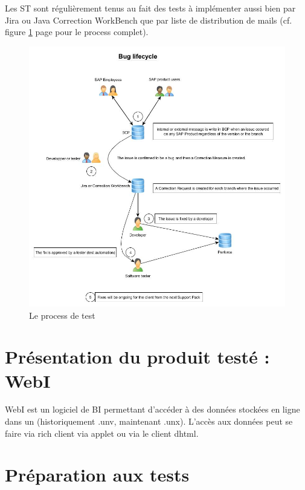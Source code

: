 Les ST sont r\'{e}guli\`{e}rement tenus au fait des tests \`{a} impl\'{e}menter aussi bien par Jira ou Java Correction WorkBench que par liste de distribution de mails (cf. figure \ref{figure:testProcess} page \pageref{figure:testProcess} pour le process complet).\\
\begin{figure}[!ht]
  \centering
      \includegraphics[width=\textwidth]{images/testProcessAtSAP.jpg}
  \caption{Le process de test}
	\label{figure:testProcess}
\end{figure}



\section{Pr\'{e}sentation du produit test\'{e} : WebI}
WebI est un logiciel de BI permettant d'acc\'{e}der \`{a} des donn\'{e}es stock\'{e}es en ligne dans un  (historiquement .unv, maintenant .unx). L'acc\`{e}s aux donn\'{e}es peut se faire via rich client via applet ou via le client dhtml.


\section{Pr\'{e}paration aux tests}






